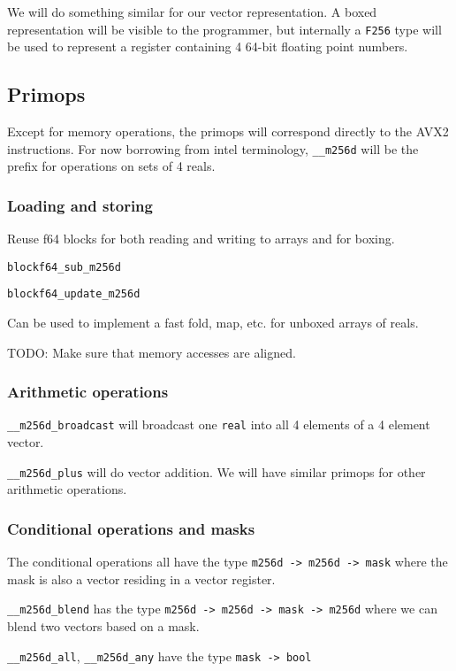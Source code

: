 \documentclass{article}
\begin{document}
We will do something similar for our vector representation. A boxed representation will be visible to the programmer, but internally a \verb!F256! type will be used to represent a register containing 4 64-bit floating point numbers.

\subsection{Primops}

Except for memory operations, the primops will correspond directly to the AVX2 instructions. For now borrowing from intel terminology, \verb!__m256d! will be the prefix for operations on sets of 4 reals.

\subsubsection{Loading and storing}

Reuse f64 blocks for both reading and writing to arrays and for boxing.

\verb!blockf64_sub_m256d!

\verb!blockf64_update_m256d!

Can be used to implement a fast fold, map, etc. for unboxed arrays of reals.


TODO: Make sure that memory accesses are aligned.

\subsubsection{Arithmetic operations}

\verb!__m256d_broadcast! will broadcast one \verb!real! into all 4 elements of a 4 element vector.

\verb!__m256d_plus! will do vector addition. We will have similar primops for other arithmetic operations.

\subsubsection{Conditional operations and masks}

The conditional operations all have the type \verb!m256d -> m256d -> mask! where the mask is also a vector residing in a vector register.

\verb!__m256d_blend! has the type \verb!m256d -> m256d -> mask -> m256d! where we can blend two vectors based on a mask.

\verb!__m256d_all!, \verb!__m256d_any! have the type \verb!mask -> bool!
\end{document}
